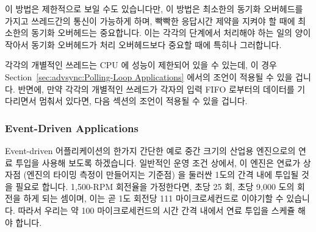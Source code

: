 이 방법은 제한적으로 보일 수도 있습니다만, 이 방법은 최소한의 동기화 오버헤드를
가지고 쓰레드간의 통신이 가능하게 하며, 빡빡한 응답시간 제약을 지켜야 할 때에
최소한의 동기화 오버헤드는 중요합니다.
이는 각각의 단계에서 처리해야 하는 일의 양이 작아서 동기화 오버헤드가 처리
오버헤드보다 중요할 때에 특히나 그러합니다.

각각의 개별적인 쓰레드는 CPU 에 성능이 제한되어 있을 수 있는데, 이 경우
Section~\ref{sec:advsync:Polling-Loop Applications}
에서의 조언이 적용될 수 있을 겁니다.
반면에, 만약 각각의 개별적인 쓰레드가 각자의 입력 FIFO 로부터의 데이터를
기다리면서 멈춰서 있다면, 다음 섹션의 조언이 적용될 수 있을 겁니다.

\subsubsection{Event-Driven Applications}
\label{sec:advsync:Event-Driven Applications}

Event-driven 어플리케이션의 한가지 간단한 예로 중간 크기의 산업용 엔진으로의
연료 투입을 사용해 보도록 하겠습니다.
일반적인 운영 조건 상에서, 이 엔진은 연료가 상자점 (엔진의 타이밍 측정이
만들어지는 기준점) 을 둘러싼 1도의 간격 내에 투입될 것을 필요로 합니다.
1,500-RPM 회전율을 가정한다면, 초당 25 회, 초당 9,000 도의 회전을 하게 되는
셈이며, 이는 곧 1도 회전당 111 마이크로세컨드로 이야기할 수 있습니다.
따라서 우리는 약 100 마이크로세컨드의 시간 간격 내에서 연료 투입을 스케쥴 해야
합니다.

